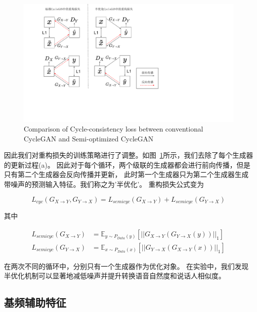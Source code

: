 \begin{figure}[!htp]
    \centering
    \includegraphics[width=13cm,trim=0 100 250 0,clip]{figure/4_semi.pdf}
    {Comparison of Cycle-consistency loss between conventional CycleGAN and Semi-optimized CycleGAN}
    \label{fig:semi}
\end{figure}

因此我们对重构损失的训练策略进行了调整。如图~\ref{fig:semi}所示，我们去除了每个生成器的更新过程(a)。
因此对于每个循环，两个级联的生成器都会进行前向传播，但是只有第二个生成器会反向传播并更新，
此时第一个生成器只为第二个生成器生成带噪声的预测输入特征。我们称之为’半优化’。
重构损失公式变为

\begin{equation}
    L_{cyc}(G_{X\rightarrow Y},G_{Y\rightarrow X}) = L_{semicyc}(G_{X\rightarrow Y}) + L_{semicyc}(G_{Y\rightarrow X})
\end{equation}

其中

\begin{align}
    L_{semicyc}(G_{X\rightarrow Y}) & = \mathbb{E}_{y\sim P_{Data}(y)}\left[ \left| \left| G_{X\rightarrow Y}(G_{Y\rightarrow X}(y)) \right| \right|_1 \right] \\
    L_{semicyc}(G_{Y\rightarrow X}) & = \mathbb{E}_{x\sim P_{Data}(x)}\left[ \left| \left| G_{Y\rightarrow X}(G_{X\rightarrow Y}(x)) \right| \right|_1 \right]
\end{align}

在两次不同的循环中，分别只有一个生成器作为优化对象。
在实验中，我们发现半优化机制可以显著地减低噪声并提升转换语音自然度和说话人相似度。

\subsection{基频辅助特征}

